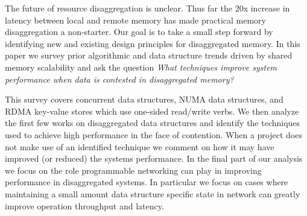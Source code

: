 The future of resource disaggregation is unclear. Thus far the 20x increase in
latency between local and remote memory has made practical memory disaggregation
a non-starter. Our goal is to take a small step forward by identifying new and
existing design principles for disaggregated memory.
In this paper we survey prior algorithmic and data structure trends driven by
shared memory scalability and ask the question \textit{What techniques improve
system performance when data is contested in disaggregated memory?}


This survey covers concurrent data structures, NUMA data structures, and RDMA
key-value stores which use one-sided read/write verbs.  We then analyze the
first few works on disaggregated data structures and identify the techniques
used to achieve high performance in the face of contention. When a project does
not make use of an identified technique we comment on how it may have improved
(or reduced) the systems performance. In the final part of our analysis we focus on
the role programmable networking can play in improving performance in
disaggregated systems.  In particular we focus on cases where maintaining a
small amount data structure specific state in network can greatly improve
operation throughput and latency.





